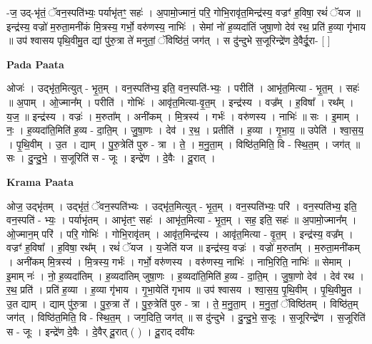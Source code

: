 \documentclass[17pt]{extarticle}
\begin{document}
-ज॒ उद्-भृ॑तं॒ ॅवन॒स्पति॑भ्यः॒ पर्याभृ॑तꣳ॒॒ सहः॑ । अ॒पामो॒ज्मानं॒ परि॒ गोभि॒रावृ॑त॒मिन्द्र॑स्य॒ वज्रꣳ॑ ह॒विषा॒ रथं॑ ॅयज ॥ इन्द्र॑स्य॒ वज्रो॑ म॒रुता॒मनी॑कं मि॒त्रस्य॒ गर्भो॒ वरु॑णस्य॒ नाभिः॑ । सेमां नो॑ ह॒व्यदा॑तिं जुषा॒णो देव॑ रथ॒ प्रति॑ ह॒व्या गृ॑भाय ॥ उप॑ श्वासय पृथि॒वीमु॒त द्यां पु॑रु॒त्रा ते॑ मनुतां॒ ॅविष्ठि॑तं॒ जग॑त् । स दु॑न्दुभे स॒जूरिन्द्रे॑ण दे॒वैर्दू॒रा- [  ] \newline

\textbf{Pada Paata} \newline

ओजः॑ । उद्भृ॑त॒मित्युत् - भृ॒त॒म् । वन॒स्पति॑भ्य॒ इति॒ वन॒स्पति॑-भ्यः॒ । परीति॑ । आभृ॑त॒मित्या - भृ॒त॒म् । सहः॑ ॥ अ॒पाम् । ओ॒ज्मान᳚म् । परीति॑ । गोभिः॑ । आवृ॑त॒मित्या-वृ॒त॒म् । इन्द्र॑स्य । वज्र᳚म् । ह॒विषा᳚ । रथ᳚म् । य॒ज॒ ॥ इन्द्र॑स्य । वज्रः॑ । म॒रुता᳚म् । अनी॑कम् । मि॒त्रस्य॑ । गर्भः॑ । वरु॑णस्य । नाभिः॑ ॥ सः । इ॒माम् । नः॒ । ह॒व्यदा॑ति॒मिति॑ ह॒व्य - दा॒ति॒म् । जु॒षा॒णः । देव॑ । र॒थ॒ । प्रतीति॑ । ह॒व्या । गृ॒भा॒य॒ ॥ उपेति॑ । श्वा॒स॒य॒ । पृ॒थि॒वीम् । उ॒त । द्याम् । पु॒रु॒त्रेति॑ पुरु - त्रा । ते॒ । म॒नु॒ता॒म् । विष्ठि॑त॒मिति॒ वि - स्थि॒त॒म् । जग॑त् ॥ सः । दु॒न्दु॒भे॒ । स॒जूरिति॑ स - जूः । इन्द्रे॑ण । दे॒वैः । दू॒रात् ।  \newline


\textbf{Krama Paata} \newline

ओज॒ उद्भृ॑तम् । उद्भृ॑तं॒ ॅवन॒स्पति॑भ्यः । उद्भृ॑त॒मित्युत् - भृ॒त॒म् । वन॒स्पति॑भ्यः॒ परि॑ । वन॒स्पति॑भ्य॒ इति॒ वन॒स्पति॑ - भ्यः॒ । पर्याभृ॑तम् । आभृ॑तꣳ॒॒ सहः॑ । आभृ॑त॒मित्या - भृ॒त॒म् । सह॒ इति॒ सहः॑ ॥ अ॒पामो॒ज्मान᳚म् । ओ॒ज्मान॒म् परि॑ । परि॒ गोभिः॑ । गोभि॒रावृ॑तम् । आवृ॑त॒मिन्द्र॑स्य । आवृ॑त॒मित्या - वृ॒त॒म् । इन्द्र॑स्य॒ वज्र᳚म् । वज्रꣳ॑ ह॒विषा᳚ । ह॒विषा॒ रथ᳚म् । रथं॑ ॅयज । य॒जेति॑ यज ॥ इन्द्र॑स्य॒ वज्रः॑ । वज्रो॑ म॒रुता᳚म् । म॒रुता॒मनी॑कम् । अनी॑कम् मि॒त्रस्य॑ । मि॒त्रस्य॒ गर्भः॑ । गर्भो॒ वरु॑णस्य । वरु॑णस्य॒ नाभिः॑ । नाभि॒रिति॒ नाभिः॑ ॥ सेमाम् । इ॒माम् नः॑ । नो॒ ह॒व्यदा॑तिम् । ह॒व्यदा॑तिम् जुषा॒णः । ह॒व्यदा॑ति॒मिति॑ ह॒व्य - दा॒ति॒म् । जु॒षा॒णो देव॑ । देव॑ रथ । र॒थ॒ प्रति॑ । प्रति॑ ह॒व्या । ह॒व्या गृ॑भाय । गृ॒भा॒येति॑ गृभाय ॥ उप॑ श्वासय । श्वा॒स॒य॒ पृ॒थि॒वीम् । पृ॒थि॒वीमु॒त । उ॒त द्याम् । द्याम् पु॑रु॒त्रा । पु॒रु॒त्रा ते᳚ । पु॒रु॒त्रेति॑ पुरु - त्रा । ते॒ म॒नु॒ता॒म् । म॒नु॒तां॒ ॅविष्ठि॑तम् । विष्ठि॑त॒म् जग॑त् । विष्ठि॑त॒मिति॒ वि - स्थि॒त॒म् । जग॒दिति॒ जग॑त् ॥ स दु॑न्दुभे । दु॒न्दु॒भे॒ स॒जूः । स॒जूरिन्द्रे॑ण । स॒जूरिति॑ स - जूः । इन्द्रे॑ण दे॒वैः । दे॒वैर् दू॒रात् ( ) । दू॒राद् दवी॑यः \newline
\end{document}
